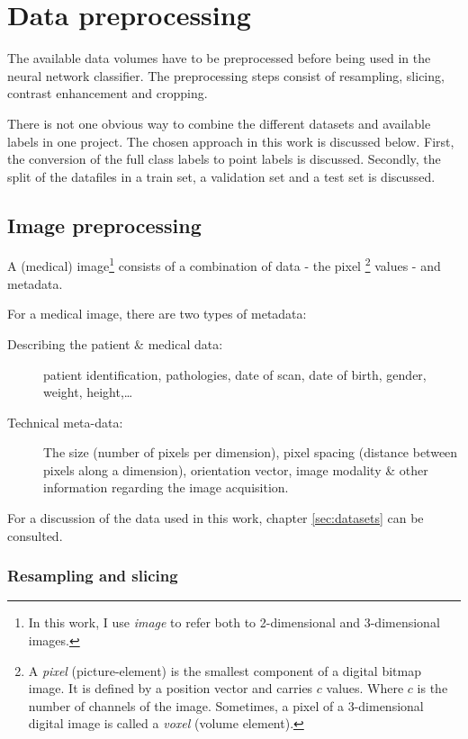 \chapter{Data preprocessing}\thispagestyle{empty}

The available data volumes have to be preprocessed before being used in the neural network classifier.
The preprocessing steps consist of resampling, slicing, contrast enhancement and cropping.  

There is not one obvious way to combine the different datasets and available labels in one project.
The chosen approach in this work is discussed below.
First, the conversion of the full class labels to point labels is discussed. 
Secondly, the split of the datafiles in a train set, a validation set and a test set is discussed.

\section{Image preprocessing}

A (medical) image\footnote{In this work, I use \textit{image} to refer both to 2-dimensional and 3-dimensional images.} consists of a combination of data - the pixel
\footnote{A \textit{pixel} (picture-element) is the smallest component of a digital bitmap image. 
It is defined by a position vector and carries $c$ values. Where $c$ is the number of channels of the image. 
Sometimes, a pixel of a 3-dimensional digital image is called a \textit{voxel} (volume element).} 
values - and metadata.

For a medical image, there are two types of metadata:
\begin{description}
    \item [Describing the patient \& medical data:] patient identification, pathologies, date of scan, date of birth, gender, weight, height,\dots
    \item [Technical meta-data:] The size (number of pixels per dimension), pixel spacing (distance between pixels along a dimension), orientation vector, image modality \& other information regarding the image acquisition.
\end{description}

For a discussion of the data used in this work, chapter \ref{sec:datasets} can be consulted. 

\subsection{Resampling and slicing\label{sec:resampling}}

